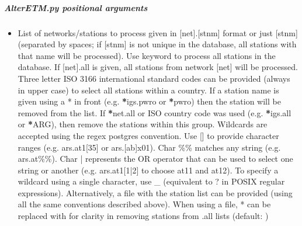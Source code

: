 \documentclass[letterpaper,10pt,english]{sphinxmanual}
\begin{document}
\subparagraph{AlterETM.py positional arguments}
\label{\detokenize{pgamit.com:AlterETM.py-positional-arguments}}\begin{itemize}
\item {} 
\sphinxAtStartPar
{\hyperref[\detokenize{pgamit.com:AlterETM.py-all|net.stnm}]{}} \sphinxhyphen{} List of networks/stations to process given in {[}net{]}.{[}stnm{]} format or just {[}stnm{]} (separated by spaces; if {[}stnm{]} is not unique in the database, all stations with that name will be processed). Use keyword  to process all stations in the database. If {[}net{]}.all is given, all stations from network {[}net{]} will be processed. Three letter ISO 3166 international standard codes can be provided (always in upper case) to select all stations within a country. If a station name is given using a * in front (e.g. {\color{red}\bfseries{}*}igs.pwro or {\color{red}\bfseries{}*}pwro) then the station will be removed from the list. If {\color{red}\bfseries{}*}net.all or ISO country code was used (e.g. {\color{red}\bfseries{}*}igs.all or {\color{red}\bfseries{}*}ARG), then remove the stations within this group. Wildcards are accepted using the regex postgres convention. Use {[}{]} to provide character ranges (e.g. ars.at1{[}3\sphinxhyphen{}5{]} or ars.{[}a\sphinxhyphen{}b{]}x01). Char \%\% matches any string (e.g. ars.at\%\%). Char | represents the OR operator that can be used to select one string or another (e.g. ars.at1{[}1|2{]} to choose at11 and at12). To specify a wildcard using a single character, use \_ (equivalent to ? in POSIX regular expressions). Alternatively, a file with the station list can be provided (using all the same conventions described above). When using a file, * can be replaced with \sphinxhyphen{} for clarity in removing stations from .all lists (default: )

\end{itemize}
\end{document}
